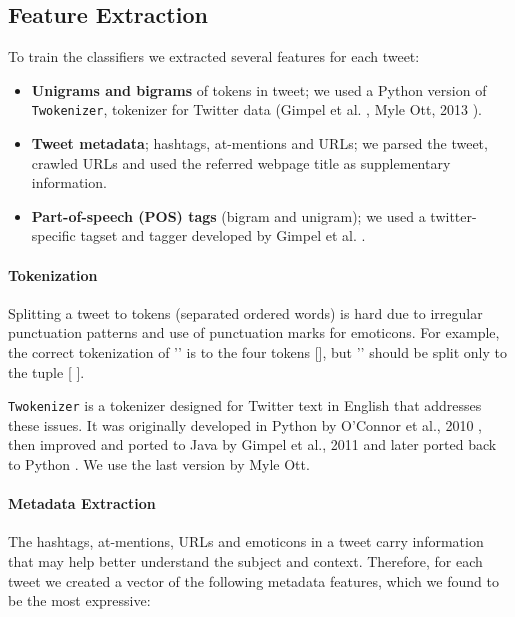 \documentclass[letterpaper,twocolumn,10pt]{article}
\begin{document}
\subsection{Feature Extraction}

To train the classifiers we extracted several features for each tweet:

\begin{itemize}[noitemsep]
	\item \textbf{Unigrams and bigrams} of tokens in tweet; we used a Python version of \texttt{Twokenizer}, tokenizer for Twitter data (Gimpel et al. \cite{POS-Tagging}, Myle Ott, 2013 \cite{ark-twokenize-py}).
	\item \textbf{Tweet metadata}; hashtags, at-mentions and URLs; we parsed the tweet, crawled URLs and used the referred webpage title as supplementary information.
	\item \textbf{Part-of-speech (POS) tags} (bigram and unigram); we used a twitter-specific tagset and tagger developed by Gimpel et al. \cite{POS-Tagging}.
\end{itemize}

\paragraph{Tokenization}
Splitting a tweet to tokens (separated ordered words) is hard due to irregular punctuation patterns and use of punctuation marks for emoticons. For example, the correct tokenization of '' is to the four tokens [], but '' should be split only to the tuple [  ].

\texttt{Twokenizer} is a tokenizer designed for Twitter text in English that addresses these issues. It was originally developed in Python by O'Connor et al., 2010 \cite{TweetMotif}, then improved and ported to Java by Gimpel et al., 2011 \cite{POS-Tagging} and later ported back to Python \cite{ark-twokenize-py}. We use the last version by Myle Ott.

\paragraph{Metadata Extraction}
The hashtags, at-mentions, URLs and emoticons in a tweet carry information that may help better understand the subject and context. Therefore, for each tweet we created a vector of the following metadata features, which we found to be the most expressive:
\end{document}
